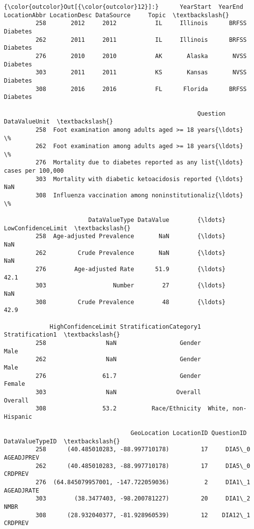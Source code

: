 \documentclass[11pt]{article}
\begin{document}
\begin{Verbatim}[commandchars=\\\{\}]
{\color{outcolor}Out[{\color{outcolor}12}]:}      YearStart  YearEnd LocationAbbr LocationDesc DataSource     Topic  \textbackslash{}
         258       2012     2012           IL     Illinois      BRFSS  Diabetes   
         262       2011     2011           IL     Illinois      BRFSS  Diabetes   
         276       2010     2010           AK       Alaska       NVSS  Diabetes   
         303       2011     2011           KS       Kansas       NVSS  Diabetes   
         308       2016     2016           FL      Florida      BRFSS  Diabetes   
         
                                                       Question      DataValueUnit  \textbackslash{}
         258  Foot examination among adults aged >= 18 years{\ldots}                  \%   
         262  Foot examination among adults aged >= 18 years{\ldots}                  \%   
         276  Mortality due to diabetes reported as any list{\ldots}  cases per 100,000   
         303  Mortality with diabetic ketoacidosis reported {\ldots}                NaN   
         308  Influenza vaccination among noninstitutionaliz{\ldots}                  \%   
         
                        DataValueType DataValue        {\ldots}         LowConfidenceLimit  \textbackslash{}
         258  Age-adjusted Prevalence       NaN        {\ldots}                        NaN   
         262         Crude Prevalence       NaN        {\ldots}                        NaN   
         276        Age-adjusted Rate      51.9        {\ldots}                       42.1   
         303                   Number        27        {\ldots}                        NaN   
         308         Crude Prevalence        48        {\ldots}                       42.9   
         
             HighConfidenceLimit StratificationCategory1      Stratification1  \textbackslash{}
         258                 NaN                  Gender                 Male   
         262                 NaN                  Gender                 Male   
         276                61.7                  Gender               Female   
         303                 NaN                 Overall              Overall   
         308                53.2          Race/Ethnicity  White, non-Hispanic   
         
                                    GeoLocation LocationID QuestionID DataValueTypeID  \textbackslash{}
         258      (40.485010283, -88.997710178)         17     DIA5\_0      AGEADJPREV   
         262      (40.485010283, -88.997710178)         17     DIA5\_0         CRDPREV   
         276  (64.845079957001, -147.722059036)          2     DIA1\_1      AGEADJRATE   
         303        (38.3477403, -98.200781227)         20     DIA1\_2            NMBR   
         308      (28.932040377, -81.928960539)         12    DIA12\_1         CRDPREV   
         

\end{Verbatim}
\end{document}
